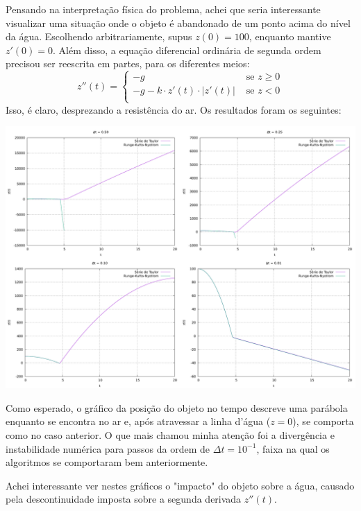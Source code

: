 \documentclass{homework}
\begin{document}
	Pensando na interpretação física do problema, achei que seria interessante visualizar uma situação onde o objeto é abandonado de um ponto acima do nível da água. Escolhendo arbitrariamente, supus $z(0) = 100$, enquanto mantive $z'(0) = 0$. Além disso, a equação diferencial ordinária de segunda ordem precisou ser reescrita em partes, para os diferentes meios:
	$$ z''(t) = \begin{cases}
		- g & \text{ se } z \ge 0\\
		- g - k \cdot z'(t) \cdot |z'(t)| & \text{ se } z < 0\\
	\end{cases}$$
	Isso, é claro, desprezando a resistência do ar. Os resultados foram os seguintes:
	\begin{fig}
		\includegraphics[width=\textwidth]{../src/plot/L6-QB.pdf}
	\end{fig}
	Como esperado, o gráfico da posição do objeto no tempo descreve uma parábola enquanto se encontra no ar e, após atravessar a linha d'água ($z = 0$), se comporta como no caso anterior. O que mais chamou minha atenção foi a divergência e instabilidade numérica para passos da ordem de $\Delta t = 10^{-1}$, faixa na qual os algoritmos se comportaram bem anteriormente.\par
	Achei interessante ver nestes gráficos o "impacto" do objeto sobre a água, causado pela descontinuidade imposta sobre a segunda derivada $z''(t)$.
	
\end{document}
